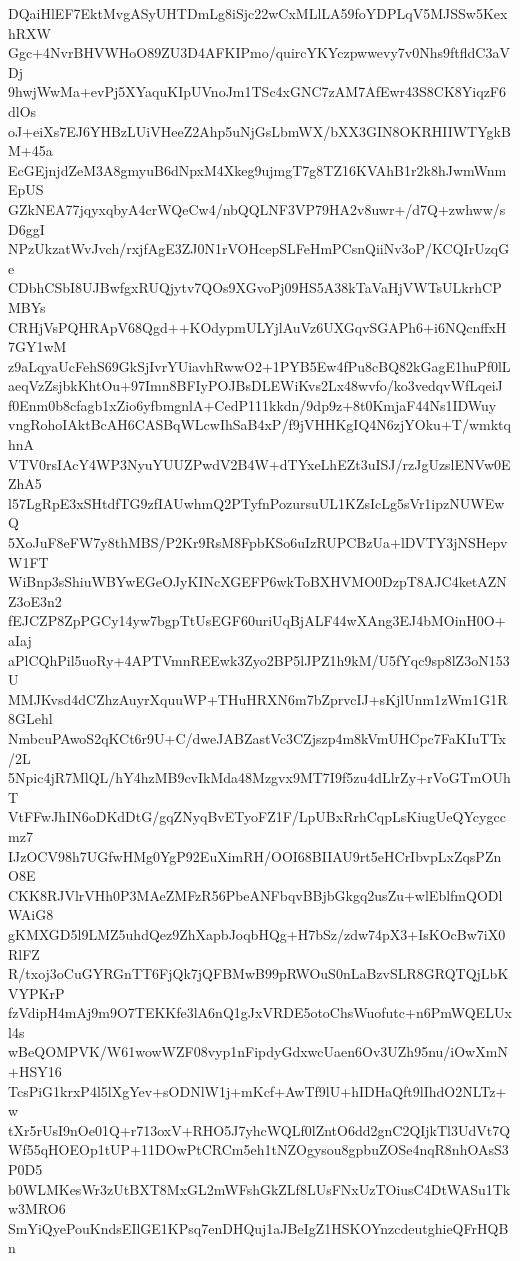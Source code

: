 DQaiHlEF7EktMvgASyUHTDmLg8iSjc22wCxMLlLA59foYDPLqV5MJSSw5KexhRXW
Ggc+4NvrBHVWHoO89ZU3D4AFKIPmo/quircYKYczpwwevy7v0Nhs9ftfldC3aVDj
9hwjWwMa+evPj5XYaquKIpUVnoJm1TSc4xGNC7zAM7AfEwr43S8CK8YiqzF6dlOs
oJ+eiXs7EJ6YHBzLUiVHeeZ2Ahp5uNjGsLbmWX/bXX3GIN8OKRHIIWTYgkBM+45a
EcGEjnjdZeM3A8gmyuB6dNpxM4Xkeg9ujmgT7g8TZ16KVAhB1r2k8hJwmWnmEpUS
GZkNEA77jqyxqbyA4crWQeCw4/nbQQLNF3VP79HA2v8uwr+/d7Q+zwhww/sD6ggI
NPzUkzatWvJvch/rxjfAgE3ZJ0N1rVOHcepSLFeHmPCsnQiiNv3oP/KCQIrUzqGe
CDbhCSbI8UJBwfgxRUQjytv7QOs9XGvoPj09HS5A38kTaVaHjVWTsULkrhCPMBYs
CRHjVsPQHRApV68Qgd++KOdypmULYjlAuVz6UXGqvSGAPh6+i6NQcnffxH7GY1wM
z9aLqyaUcFehS69GkSjIvrYUiavhRwwO2+1PYB5Ew4fPu8cBQ82kGagE1huPf0lL
aeqVzZsjbkKhtOu+97Imn8BFIyPOJBsDLEWiKvs2Lx48wvfo/ko3vedqvWfLqeiJ
f0Enm0b8cfagb1xZio6yfbmgnlA+CedP111kkdn/9dp9z+8t0KmjaF44Ns1IDWuy
vngRohoIAktBcAH6CASBqWLcwIhSaB4xP/f9jVHHKgIQ4N6zjYOku+T/wmktqhnA
VTV0rsIAcY4WP3NyuYUUZPwdV2B4W+dTYxeLhEZt3uISJ/rzJgUzslENVw0EZhA5
l57LgRpE3xSHtdfTG9zfIAUwhmQ2PTyfnPozursuUL1KZsIcLg5sVr1ipzNUWEwQ
5XoJuF8eFW7y8thMBS/P2Kr9RsM8FpbKSo6uIzRUPCBzUa+lDVTY3jNSHepvW1FT
WiBnp3sShiuWBYwEGeOJyKINcXGEFP6wkToBXHVMO0DzpT8AJC4ketAZNZ3oE3n2
fEJCZP8ZpPGCy14yw7bgpTtUsEGF60uriUqBjALF44wXAng3EJ4bMOinH0O+aIaj
aPlCQhPil5uoRy+4APTVmnREEwk3Zyo2BP5lJPZ1h9kM/U5fYqc9sp8lZ3oN153U
MMJKvsd4dCZhzAuyrXquuWP+THuHRXN6m7bZprvcIJ+sKjlUnm1zWm1G1R8GLehl
NmbcuPAwoS2qKCt6r9U+C/dweJABZastVc3CZjszp4m8kVmUHCpc7FaKIuTTx/2L
5Npic4jR7MlQL/hY4hzMB9cvIkMda48Mzgvx9MT7I9f5zu4dLlrZy+rVoGTmOUhT
VtFFwJhIN6oDKdDtG/gqZNyqBvETyoFZ1F/LpUBxRrhCqpLsKiugUeQYcygccmz7
IJzOCV98h7UGfwHMg0YgP92EuXimRH/OOI68BIIAU9rt5eHCrIbvpLxZqsPZnO8E
CKK8RJVlrVHh0P3MAeZMFzR56PbeANFbqvBBjbGkgq2usZu+wlEblfmQODlWAiG8
gKMXGD5l9LMZ5uhdQez9ZhXapbJoqbHQg+H7bSz/zdw74pX3+IsKOcBw7iX0RlFZ
R/txoj3oCuGYRGnTT6FjQk7jQFBMwB99pRWOuS0nLaBzvSLR8GRQTQjLbKVYPKrP
fzVdipH4mAj9m9O7TEKKfe3lA6nQ1gJxVRDE5otoChsWuofutc+n6PmWQELUxl4s
wBeQOMPVK/W61wowWZF08vyp1nFipdyGdxwcUaen6Ov3UZh95nu/iOwXmN+HSY16
TcsPiG1krxP4l5lXgYev+sODNlW1j+mKcf+AwTf9lU+hIDHaQft9lIhdO2NLTz+w
tXr5rUsI9nOe01Q+r713oxV+RHO5J7yhcWQLf0lZntO6dd2gnC2QIjkTl3UdVt7Q
Wf55qHOEOp1tUP+11DOwPtCRCm5eh1tNZOgysou8gpbuZOSe4nqR8nhOAsS3P0D5
b0WLMKesWr3zUtBXT8MxGL2mWFshGkZLf8LUsFNxUzTOiusC4DtWASu1Tkw3MRO6
SmYiQyePouKndsEIlGE1KPsq7enDHQuj1aJBeIgZ1HSKOYnzcdeutghieQFrHQBn
